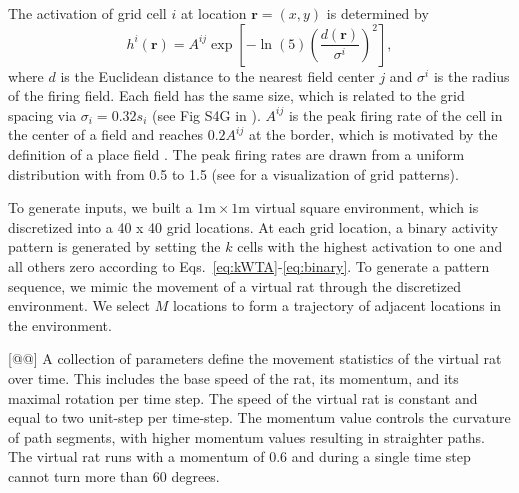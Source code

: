 \documentclass[utf8]{frontiersSCNS} %
\begin{document}
The activation of grid cell $i$ at location $\mathbf{r}=(x,y)$ is determined by
\begin{equation}
\label{eq:grid}
h^i(\mathbf{r}) = A^{ij} \exp \left[ -\ln(5) \left(\frac{d(\mathbf{r})}{\sigma^i}\right)^2 \right],
\end{equation}
where $d$ is the Euclidean distance to the nearest field center $j$ and $\sigma^i$ is the radius of the firing field.
%
Each field has the same size, which is related to the grid spacing via $ \sigma_i  = 0.32 s_i $ (see Fig
S4G in \citep{hafting2005microstructure}). 
%
$A^{ij}$ is the peak firing rate of the cell in the center of a field and reaches $0.2 A^{ij}$ at the border, which is motivated by the definition of a place field \citep{hafting2005microstructure}. The peak firing rates are drawn from a uniform distribution with from 0.5 to 1.5 (see \citep{neher2015memory} for a visualization of grid patterns).  
%

To generate inputs, we built a $1\textrm{m} \times 1\textrm{m}$ virtual square environment, which is discretized into a 40 x 40 grid locations. At each grid location, a binary activity pattern is generated by setting the $k$ cells with the highest activation to one and all others zero according to Eqs.~\ref{eq:kWTA}-\ref{eq:binary}. To generate a pattern sequence, we mimic the movement of a virtual rat through the discretized environment. We select $M$ locations to form a trajectory of adjacent locations in the environment. %

[@@] A collection of parameters define the movement statistics of the virtual rat over time. This includes the base speed of the rat, its momentum, and its maximal rotation per time step. 
%
The speed of the virtual rat is constant and equal to two unit-step per time-step.
%
The momentum value controls the curvature of path segments, with higher momentum values resulting in straighter paths. 
%
The virtual rat runs with a momentum of 0.6 and during a single time step cannot turn more than 60 degrees.   
%
\end{document}
